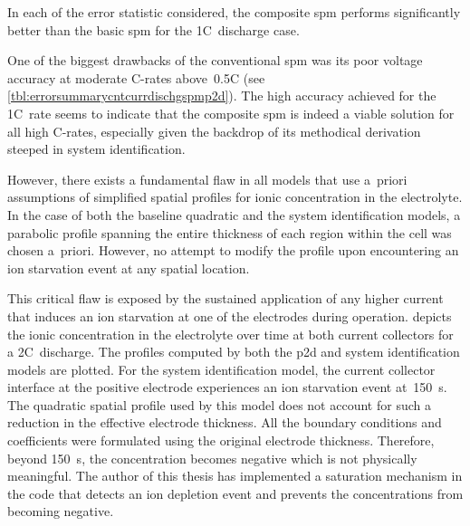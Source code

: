 

In  each of  the error  statistic considered,  the composite  \gls{spm} performs
significantly better than the basic \gls{spm} for the 1C~discharge case.

One   of   the   biggest   drawbacks   of   the   conventional   \gls{spm}   was
its    poor    voltage    accuracy    at    moderate    C-rates    above~0.5C
(see \cref{tbl:errorsummarycntcurrdischgspmp2d}). The high accuracy achieved for
the 1C~rate  seems to indicate that  the composite \gls{spm} is  indeed a viable
solution for all  high C-rates, especially given the backdrop  of its methodical
derivation steeped in system identification.

However,  there exists  a  fundamental  flaw in  all  models  that use  a~priori
assumptions  of  simplified spatial  profiles  for  ionic concentration  in  the
electrolyte.  In  the  case  of  both the  baseline  quadratic  and  the  system
identification models, a parabolic profile spanning the entire thickness of each
region within the cell was chosen a~priori. However, no attempt to modify the
profile upon encountering an ion starvation event at any spatial location.

This  critical flaw  is  exposed  by the  sustained  application  of any  higher
current  that  induces  an  ion  starvation at  one  of  the  electrodes  during
operation.   depicts  the  ionic concentration  in  the
electrolyte  over  time at  both  current  collectors  for a  2C~discharge.  The
profiles  computed  by  both  the \gls{p2d}  and  system  identification  models
are  plotted.  For  the  system  identification  model,  the  current  collector
interface  at  the  positive  electrode  experiences  an  ion  starvation  event
at~\approx\SI{150}{\second}. The  quadratic spatial  profile used by  this model
does not account for such a  reduction in the effective electrode thickness. All
the  boundary conditions  and coefficients  were formulated  using the  original
electrode  thickness.  Therefore,  beyond \SI{150}{\second},  the  concentration
becomes negative which  is not physically meaningful. The author  of this thesis
has implemented a saturation mechanism in the code that detects an ion depletion
event and prevents the concentrations from becoming negative.

